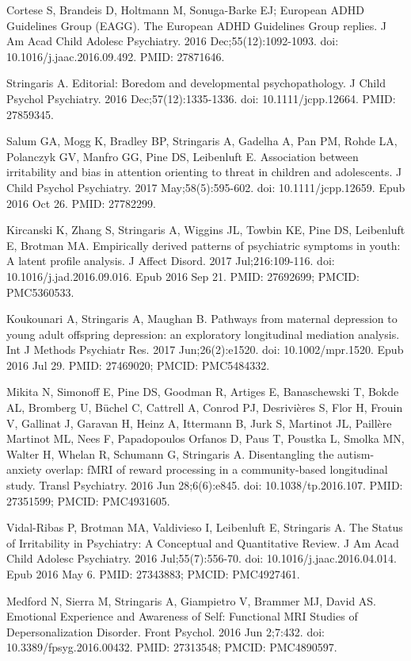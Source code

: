 \documentclass[
]{article}
\begin{document}
Cortese S, Brandeis D, Holtmann M, Sonuga-Barke EJ; European ADHD
Guidelines Group (EAGG). The European ADHD Guidelines Group replies. J
Am Acad Child Adolesc Psychiatry. 2016 Dec;55(12):1092-1093. doi:
10.1016/j.jaac.2016.09.492. PMID: 27871646.

Stringaris A. Editorial: Boredom and developmental psychopathology. J
Child Psychol Psychiatry. 2016 Dec;57(12):1335-1336. doi:
10.1111/jcpp.12664. PMID: 27859345.

Salum GA, Mogg K, Bradley BP, Stringaris A, Gadelha A, Pan PM, Rohde LA,
Polanczyk GV, Manfro GG, Pine DS, Leibenluft E. Association between
irritability and bias in attention orienting to threat in children and
adolescents. J Child Psychol Psychiatry. 2017 May;58(5):595-602. doi:
10.1111/jcpp.12659. Epub 2016 Oct 26. PMID: 27782299.

Kircanski K, Zhang S, Stringaris A, Wiggins JL, Towbin KE, Pine DS,
Leibenluft E, Brotman MA. Empirically derived patterns of psychiatric
symptoms in youth: A latent profile analysis. J Affect Disord. 2017
Jul;216:109-116. doi: 10.1016/j.jad.2016.09.016. Epub 2016 Sep 21. PMID:
27692699; PMCID: PMC5360533.

Koukounari A, Stringaris A, Maughan B. Pathways from maternal depression
to young adult offspring depression: an exploratory longitudinal
mediation analysis. Int J Methods Psychiatr Res. 2017 Jun;26(2):e1520.
doi: 10.1002/mpr.1520. Epub 2016 Jul 29. PMID: 27469020; PMCID:
PMC5484332.

Mikita N, Simonoff E, Pine DS, Goodman R, Artiges E, Banaschewski T,
Bokde AL, Bromberg U, Büchel C, Cattrell A, Conrod PJ, Desrivières S,
Flor H, Frouin V, Gallinat J, Garavan H, Heinz A, Ittermann B, Jurk S,
Martinot JL, Paillère Martinot ML, Nees F, Papadopoulos Orfanos D, Paus
T, Poustka L, Smolka MN, Walter H, Whelan R, Schumann G, Stringaris A.
Disentangling the autism-anxiety overlap: fMRI of reward processing in a
community-based longitudinal study. Transl Psychiatry. 2016 Jun
28;6(6):e845. doi: 10.1038/tp.2016.107. PMID: 27351599; PMCID:
PMC4931605.

Vidal-Ribas P, Brotman MA, Valdivieso I, Leibenluft E, Stringaris A. The
Status of Irritability in Psychiatry: A Conceptual and Quantitative
Review. J Am Acad Child Adolesc Psychiatry. 2016 Jul;55(7):556-70. doi:
10.1016/j.jaac.2016.04.014. Epub 2016 May 6. PMID: 27343883; PMCID:
PMC4927461.

Medford N, Sierra M, Stringaris A, Giampietro V, Brammer MJ, David AS.
Emotional Experience and Awareness of Self: Functional MRI Studies of
Depersonalization Disorder. Front Psychol. 2016 Jun 2;7:432. doi:
10.3389/fpsyg.2016.00432. PMID: 27313548; PMCID: PMC4890597.
\end{document}
